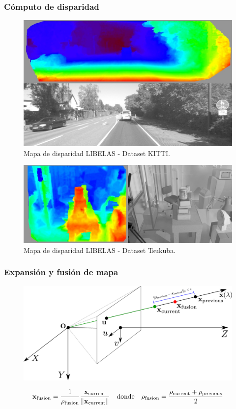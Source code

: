 \begin{frame}
\frametitle{Cómputo de disparidad}

\begin{figure}[htb]
	\centering
	\includegraphics[width=0.5\columnwidth]{method/libelas_merge_kitti04_22.jpg}
	\caption{Mapa de disparidad LIBELAS - Dataset KITTI.}
\end{figure}
\begin{figure}[htb]
	\centering
	\includegraphics[width=0.5\columnwidth]{method/libelas_merge_tsukuba_222.jpg}
	\caption{Mapa de disparidad LIBELAS - Dataset Tsukuba.}
\end{figure}

\end{frame}


\begin{frame}
	\frametitle{Expansión y fusión de mapa}
	\begin{figure}[htb]
		\centering
		\includegraphics[width=\columnwidth]{images/map_fusion.pdf}
	\end{figure}
	
	\begin{equation*}
		\boldsymbol{\mathbf{x}}_{\mathrm{\mathrm{fusion}}} = \dfrac{1}{\rho_\mathrm{\mathrm{fusion}}} \dfrac{\boldsymbol{\mathbf{x}}_{\mathrm{\mathrm{current}}}}{\left\lVert\boldsymbol{\mathbf{x}}_{\mathrm{\mathrm{current}}}\right\rVert}
		\quad \text{donde} \quad 
		\rho_{\mathrm{fusion}} = \dfrac{\rho_{\mathrm{current}} + \rho_{\mathrm{previous}}}{2}
	\end{equation*}
\end{frame}
